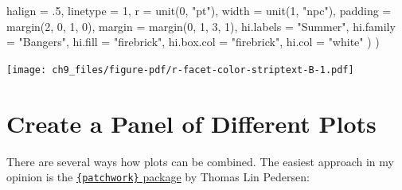 \documentclass[
  letterpaper,
  DIV=11,
  numbers=noendperiod]{scrreprt}
\newenvironment{Shaded}{\begin{snugshade}}{\end{snugshade}}
\newcommand{\AttributeTok}[1]{\textcolor[rgb]{0.40,0.45,0.13}{#1}}
\newcommand{\DecValTok}[1]{\textcolor[rgb]{0.68,0.00,0.00}{#1}}
\newcommand{\FunctionTok}[1]{\textcolor[rgb]{0.28,0.35,0.67}{#1}}
\newcommand{\NormalTok}[1]{\textcolor[rgb]{0.00,0.23,0.31}{#1}}
\newcommand{\StringTok}[1]{\textcolor[rgb]{0.13,0.47,0.30}{#1}}
\begin{document}
\begin{Shaded}
\begin{Highlighting}[]
      \AttributeTok{halign =}\NormalTok{ .}\DecValTok{5}\NormalTok{, }\AttributeTok{linetype =} \DecValTok{1}\NormalTok{, }\AttributeTok{r =} \FunctionTok{unit}\NormalTok{(}\DecValTok{0}\NormalTok{, }\StringTok{"pt"}\NormalTok{), }\AttributeTok{width =} \FunctionTok{unit}\NormalTok{(}\DecValTok{1}\NormalTok{, }\StringTok{"npc"}\NormalTok{),}
      \AttributeTok{padding =} \FunctionTok{margin}\NormalTok{(}\DecValTok{2}\NormalTok{, }\DecValTok{0}\NormalTok{, }\DecValTok{1}\NormalTok{, }\DecValTok{0}\NormalTok{), }\AttributeTok{margin =} \FunctionTok{margin}\NormalTok{(}\DecValTok{0}\NormalTok{, }\DecValTok{1}\NormalTok{, }\DecValTok{3}\NormalTok{, }\DecValTok{1}\NormalTok{),}
      \AttributeTok{hi.labels =} \StringTok{"Summer"}\NormalTok{, }\AttributeTok{hi.family =} \StringTok{"Bangers"}\NormalTok{,}
      \AttributeTok{hi.fill =} \StringTok{"firebrick"}\NormalTok{, }\AttributeTok{hi.box.col =} \StringTok{"firebrick"}\NormalTok{, }\AttributeTok{hi.col =} \StringTok{"white"}
\NormalTok{    )}
\NormalTok{  )}
\end{Highlighting}
\end{Shaded}

\texttt{[image: ch9\_files/figure-pdf/r-facet-color-striptext-B-1.pdf]}

\section{Create a Panel of Different
Plots}\label{create-a-panel-of-different-plots}

There are several ways how plots can be combined. The easiest approach
in my opinion is the
\href{https://github.com/thomasp85/patchwork}{\texttt{\{patchwork\}}
package} by Thomas Lin Pedersen:
\end{document}
